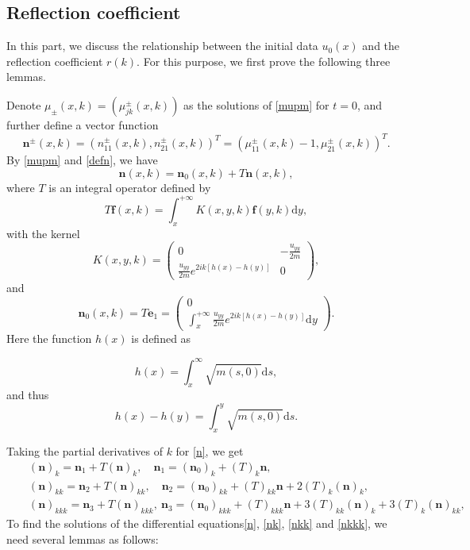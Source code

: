 \documentclass[11pt]{article}
\numberwithin{equation}{section}
\begin{document}
\subsection{Reflection coefficient}\label{subs2.2}

In this part, we discuss the relationship between the initial data $u_0(x) $ and the reflection coefficient $r(k)$.  For this purpose, we first prove the following three lemmas.

Denote $\mu_{\pm}(x,k)=\left(\mu_{jk}^{\pm}(x,k)\right)$ as the solutions of \eqref{mupm} for $t=0$, and further define a vector function
\begin{equation}
    \textbf{n}^{\pm}(x,k)=(n^{\pm}_{11}(x,k),n^{\pm}_{21}(x,k))^T=(\mu_{11}^{\pm}(x,k)-1,\mu_{21}^{\pm}(x,k))^T.\label{defn}
\end{equation}
By \eqref{mupm} and \eqref{defn}, we have
\begin{equation}
\textbf{n}(x,k)=\textbf{n}_0(x,k)+T\textbf{n}(x,k),\label{n}
\end{equation}
where $T$ is an integral operator defined by
\begin{equation}
T\textbf{f}(x,k)=\int_x^{+\infty}K(x,y,k)\textbf{f}(y,k)\mathrm{d}y,\label{defT}
\end{equation}
with the kernel
\begin{equation}
K(x,y,k)=\left(\begin{array}{cc}0&-\frac{u_{yy}}{2m}\\\frac{u_{yy}}{2m}e^{2ik\left[h(x)-h(y)\right]}&0\end{array}\right),\label{K}
\end{equation}
and
\begin{equation}
\textbf{n}_0(x,k)=T\textbf{e}_1=\left(\begin{array}{c}0\\ \int_x^{+\infty}\frac{u_{yy}}{2m}e^{2ik\left[h(x)-h(y)\right]}\mathrm{d}y\end{array}\right).
\end{equation}
Here the function $h(x)$ is defined as

\begin{equation*}
h(x)=\int_x^{\infty}\sqrt{m(s,0)}\mathrm{d}s,
\end{equation*}
and thus
\begin{equation*}
h(x)-h(y)=\int_x^y\sqrt{m(s,0)}\mathrm{d}s.
\end{equation*}

Taking the partial derivatives of $k$ for \eqref{n}, we get
\begin{eqnarray}
&&(\textbf{n})_k=\textbf{n}_1+T(\textbf{n})_k,\quad  \textbf{n}_1=(\textbf{n}_0)_k+(T)_k\textbf{n},\label{nk}\\
&&(\textbf{n})_{kk}=\textbf{n}_2+T(\textbf{n})_{kk},\quad \textbf{n}_2=(\textbf{n}_0)_{kk}+(T)_{kk}\textbf{n}+2(T)_k(\textbf{n})_k,\label{nkk}\\
&&(\textbf{n})_{kkk}=\textbf{n}_3+T(\textbf{n})_{kkk},\ \textbf{n}_3=(\textbf{n}_0)_{kkk}+(T)_{kkk}\textbf{n}+3(T)_{kk}(\textbf{n})_k+3(T)_k(\textbf{n})_{kk},\qquad\label{nkkk}
\end{eqnarray}
To find the solutions of the differential equations\eqref{n}, \eqref{nk}, \eqref{nkk} and \eqref{nkkk}, we need several lemmas as follows:
\end{document}
